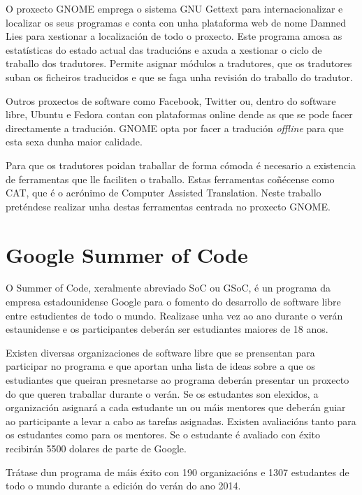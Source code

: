 O proxecto GNOME emprega o sistema GNU Gettext para internacionalizar e localizar os seus programas e conta con unha plataforma web de nome Damned Lies para xestionar a localización de todo o proxecto. Este programa amosa as estatísticas do estado actual das traducións e axuda a xestionar o ciclo de traballo dos tradutores. Permite asignar módulos a tradutores, que os tradutores suban os ficheiros traducidos e que se faga unha revisión do traballo do tradutor.

Outros proxectos de software como Facebook, Twitter ou, dentro do software libre, Ubuntu e Fedora contan con plataformas online dende as que se pode facer directamente a tradución. GNOME opta por facer a tradución \emph{offline} para que esta sexa dunha maior calidade.

Para que os tradutores poidan traballar de forma cómoda é necesario a existencia de ferramentas que lle faciliten o traballo. Estas ferramentas coñécense como CAT, que é o acrónimo de Computer Assisted Translation. Neste traballo preténdese realizar unha destas ferramentas centrada no proxecto GNOME.

\section{Google Summer of Code}
O Summer of Code, xeralmente abreviado SoC ou GSoC, é un programa da empresa estadounidense Google para o fomento do desarrollo de software libre entre estudientes de todo o mundo. Realizase unha vez ao ano durante o verán estaunidense e os participantes deberán ser estudiantes maiores de 18 anos.

Existen diversas organizaciones de software libre que se prensentan para participar no programa e que aportan unha lista de ideas sobre a que os estudiantes que queiran presnetarse ao programa deberán presentar un proxecto do que queren traballar durante o verán. Se os estudantes son elexidos, a organización asignará a cada estudante un ou máis mentores que deberán guiar ao participante a levar a cabo as tarefas asignadas. Existen avaliacións tanto para os estudantes como para os mentores. Se o estudante é avaliado con éxito recibirán 5500 dolares de parte de Google.

Trátase dun programa de máis éxito con 190 organizacións e 1307 estudantes de todo o mundo durante a edición do verán do ano 2014. 

